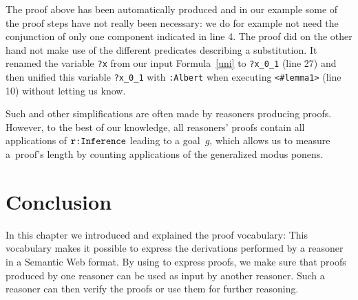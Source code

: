 
The proof above has been automatically produced and in our example some of the proof steps have not really been necessary: 
we do for example not need the conjunction of only one component indicated in line 4. The proof did on the other hand not make use of the different predicates describing a substitution. 
It renamed the variable \texttt{?x} from our input Formula~\ref{uni} to \texttt{?x\_0\_1} (line 27) and then unified this variable \texttt{?x\_0\_1} with \texttt{:Albert} when executing 
\texttt{<\#lemma1>} (line 10) without letting us know. 

Such and other simplifications are often made by \nthree reasoners producing proofs.
% 
% 
% 
However, to the best of our knowledge,
all reasoners' proofs contain all applications of $\verb!r:Inference!$ leading to a goal~$g$,
which allows us to measure a~proof's length by counting applications of the generalized modus ponens.



\section{Conclusion}
In this chapter we introduced and explained the \nthree proof vocabulary: This vocabulary makes it possible to express the derivations performed by a reasoner in a Semantic Web format. 
By using \nthree to express proofs, we make sure that proofs produced by one reasoner can be used as input by another reasoner. Such a reasoner
can then verify the proofs or use them for further reasoning. 

